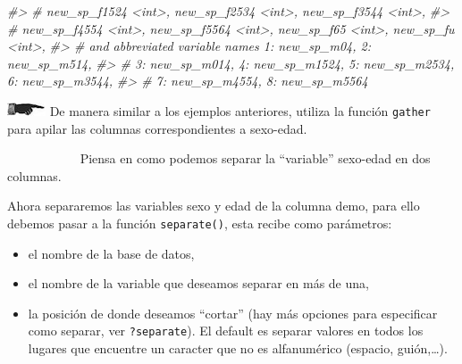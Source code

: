 \documentclass[
]{book}
\newenvironment{Shaded}{\begin{snugshade}}{\end{snugshade}}
\newcommand{\CommentTok}[1]{\textcolor[rgb]{0.56,0.35,0.01}{\textit{#1}}}
\begin{document}
\begin{Shaded}
\begin{Highlighting}[]
\CommentTok{\#\textgreater{} \#   new\_sp\_f1524 \textless{}int\textgreater{}, new\_sp\_f2534 \textless{}int\textgreater{}, new\_sp\_f3544 \textless{}int\textgreater{},}
\CommentTok{\#\textgreater{} \#   new\_sp\_f4554 \textless{}int\textgreater{}, new\_sp\_f5564 \textless{}int\textgreater{}, new\_sp\_f65 \textless{}int\textgreater{}, new\_sp\_fu \textless{}int\textgreater{},}
\CommentTok{\#\textgreater{} \#   and abbreviated variable names 1: new\_sp\_m04, 2: new\_sp\_m514,}
\CommentTok{\#\textgreater{} \#   3: new\_sp\_m014, 4: new\_sp\_m1524, 5: new\_sp\_m2534, 6: new\_sp\_m3544,}
\CommentTok{\#\textgreater{} \#   7: new\_sp\_m4554, 8: new\_sp\_m5564}
\end{Highlighting}
\end{Shaded}

\includegraphics{imagenes/manicule2.jpg} De manera similar a los ejemplos anteriores,
utiliza la función \texttt{gather} para apilar las columnas correspondientes a
sexo-edad.

~~~~~~~~~~~ Piensa en
como podemos separar la ``variable'' sexo-edad en dos columnas.

Ahora separaremos las variables sexo y edad de la columna demo, para ello
debemos pasar a la función \texttt{separate()}, esta recibe como parámetros:

\begin{itemize}
\item
  el nombre de la base de datos,
\item
  el nombre de la variable que deseamos separar en más de una,
\item
  la posición de donde deseamos ``cortar'' (hay más opciones para especificar
  como separar, ver \texttt{?separate}). El default es separar valores en todos los
  lugares que encuentre un caracter que no es alfanumérico (espacio, guión,\ldots).
\end{itemize}
\end{document}
